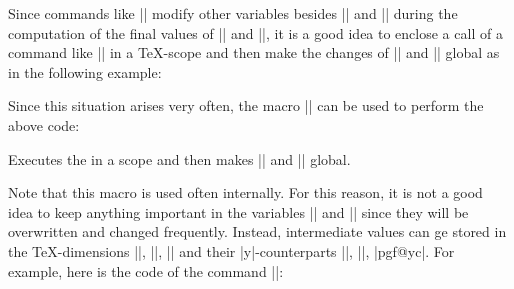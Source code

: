 Since commands like |\pgfpointnormalised| modify other variables
besides |\pgf@x| and |\pgf@y| during the computation of the final values of
|\pgf@x| and |\pgf@y|, it is a good idea to enclose a call of a
command like |\pgfpoint| in a \TeX-scope and then make the changes of
|\pgf@x| and |\pgf@y| global as in the following example:

\makeatletter
Since this situation arises very often, the macro |\pgf@process| can
be used to perform the above code:
\begin{command}{\pgf@process{}}
  Executes the  in a scope and then makes |\pgf@x| and
  |\pgf@y| global.
\end{command}

Note that this macro is used often internally. For this reason, it is
not a good idea to keep anything important in the variables |\pgf@x|
and |\pgf@y| since they will be overwritten and changed
frequently. Instead, intermediate values can ge stored in the
\TeX-dimensions |\pgf@xa|, |\pgf@xb|, |\pgf@xc| and their
|y|-counterparts |\pgf@ya|, |\pgf@yb|, |pgf@yc|. For example, here is
the code of the command |\pgfpointadd|:
\begin{codeexample}
\def\pgfpointadd#1#2{%
  \pgf@process{#1}%
  \pgf@xa=\pgf@x%
  \pgf@ya=\pgf@y%
  \pgf@process{#2}%
  \advance\pgf@x by\pgf@xa%
  \advance\pgf@y by\pgf@ya}
\end{codeexample}



